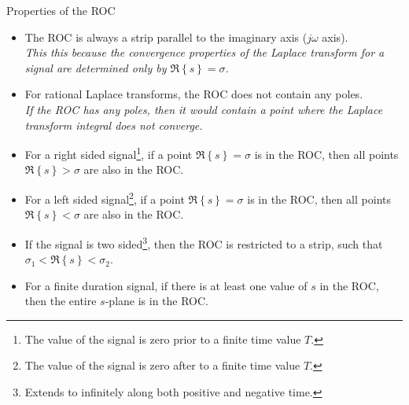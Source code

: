 \documentclass{beamer}
\begin{document}
\begin{frame}{Properties of the ROC}

\begin{small}
\begin{itemize}
\item The ROC is always a strip parallel to the imaginary axis ($j\omega$ axis).\\
\textit{This this because the convergence properties of the Laplace transform for a signal are determined only by $\Re \left\lbrace s \right\rbrace = \sigma$.}
\item For rational Laplace transforms, the ROC does not contain any poles.\\
\textit{If the ROC has any poles, then it would contain a point where the Laplace transform integral does not converge.}
\item For a right sided signal\footnote{The value of the signal is zero prior to a finite time value $T$.}, if a point $\Re \left\lbrace s \right\rbrace = \sigma$ is in the ROC, then all points $\Re \left\lbrace s \right\rbrace > \sigma$ are also in the ROC.
\item For a left sided signal\footnote{The value of the signal is zero after to a finite time value $T$.}, if a point $\Re \left\lbrace s \right\rbrace = \sigma$ is in the ROC, then all points $\Re \left\lbrace s \right\rbrace < \sigma$ are also in the ROC.
\item If the signal is two sided\footnote{Extends to infinitely along both positive and negative time.}, then the ROC is restricted to a strip, such that $\sigma_1 < \Re \left\lbrace s \right\rbrace < \sigma_2$.
\item For a finite duration signal, if there is at least one value of $s$ in the ROC, then the entire $s$-plane is in the ROC.
\end{itemize}
\end{small}
\end{frame}
\end{document}
